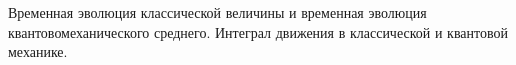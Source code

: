 \documentclass[__main__.tex]{subfiles}
\begin{document}
Временная эволюция классической величины и временная эволюция квантовомеханического среднего. Интеграл движения в классической и квантовой механике.\\ 

\end{document}
